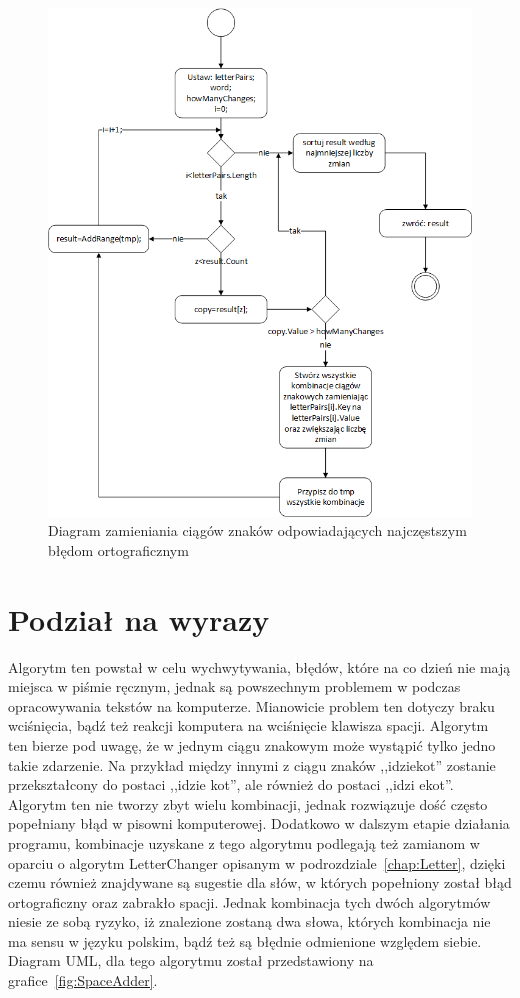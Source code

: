 \begin{figure} [H]
	\centering
	\includegraphics[width=1\linewidth]{rozdzial02/LetterChanger.png}
	\caption{Diagram zamieniania ciągów znaków odpowiadających najczęstszym błędom ortograficznym}
	\label{fig:LetterChanger}
\end{figure}

\section{Podział na wyrazy}
Algorytm ten powstał w celu wychwytywania, błędów, które na co dzień nie mają miejsca w piśmie ręcznym, jednak są powszechnym problemem w podczas opracowywania tekstów na komputerze. Mianowicie problem ten dotyczy braku wciśnięcia, bądź też reakcji komputera na wciśnięcie klawisza spacji. Algorytm ten bierze pod uwagę, że w jednym ciągu znakowym może wystąpić tylko jedno takie zdarzenie. Na przykład między innymi z ciągu znaków ,,idziekot'' zostanie przekształcony do postaci ,,idzie kot'', ale również do postaci ,,idzi ekot''. Algorytm ten nie tworzy zbyt wielu kombinacji, jednak rozwiązuje dość często popełniany błąd w pisowni komputerowej. Dodatkowo w dalszym etapie działania programu, kombinacje uzyskane z tego algorytmu podlegają też zamianom w oparciu o algorytm LetterChanger opisanym w podrozdziale~\ref{chap:Letter}, dzięki czemu również znajdywane są sugestie dla słów, w których popełniony został błąd ortograficzny oraz zabrakło spacji. Jednak kombinacja tych dwóch algorytmów niesie ze sobą ryzyko, iż znalezione zostaną dwa słowa, których kombinacja nie ma sensu w języku polskim, bądź też są błędnie odmienione względem siebie. Diagram UML, dla tego algorytmu został przedstawiony na grafice~\ref{fig:SpaceAdder}. 


